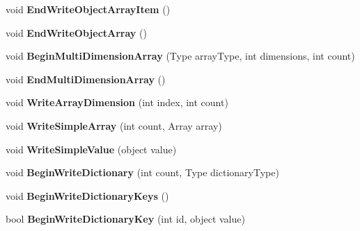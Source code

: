 \begin{DoxyCompactItemize}
void {\bfseries End\+Write\+Object\+Array\+Item} ()
\item 
\mbox{\label{interface_serialization_1_1_i_storage_a0b6c30b5cb2849e6b9a6e46416867c96}} 
void {\bfseries End\+Write\+Object\+Array} ()
\item 
\mbox{\label{interface_serialization_1_1_i_storage_a72684673376a726a241741854652b3ba}} 
void {\bfseries Begin\+Multi\+Dimension\+Array} (Type array\+Type, int dimensions, int count)
\item 
\mbox{\label{interface_serialization_1_1_i_storage_aace2c7b698493c52356bff6422d37f74}} 
void {\bfseries End\+Multi\+Dimension\+Array} ()
\item 
\mbox{\label{interface_serialization_1_1_i_storage_a844c1dfe7f787cbf76d0521ca4ea11ef}} 
void {\bfseries Write\+Array\+Dimension} (int index, int count)
\item 
\mbox{\label{interface_serialization_1_1_i_storage_a94937afa442d505b3802f9dd19675ee2}} 
void {\bfseries Write\+Simple\+Array} (int count, Array array)
\item 
\mbox{\label{interface_serialization_1_1_i_storage_ad71e5330badb887d80a59b576dbd9e1e}} 
void {\bfseries Write\+Simple\+Value} (object value)
\item 
\mbox{\label{interface_serialization_1_1_i_storage_ac8185d715cc5318790a408427e5bc113}} 
void {\bfseries Begin\+Write\+Dictionary} (int count, Type dictionary\+Type)
\item 
\mbox{\label{interface_serialization_1_1_i_storage_a06dcc7ec3a100509abc863136d0cd6f3}} 
void {\bfseries Begin\+Write\+Dictionary\+Keys} ()
\item 
\mbox{\label{interface_serialization_1_1_i_storage_a73c60fce612a22b4832223b245688384}} 
bool {\bfseries Begin\+Write\+Dictionary\+Key} (int id, object value)
\item 

\end{DoxyCompactItemize}
